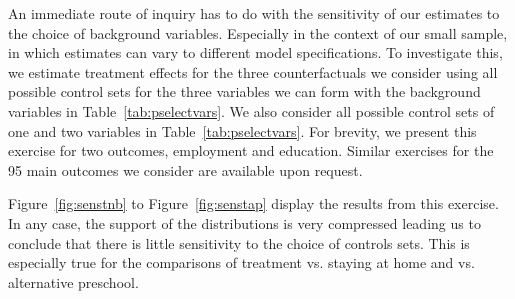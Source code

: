 \noindent An immediate route of inquiry has to do with the sensitivity of our estimates to the choice of background variables. Especially in the context of our small sample, in which estimates can vary to different model specifications. To investigate this, we estimate treatment effects for the three counterfactuals we consider using all possible control sets for the three variables we can form with the background variables in Table~\ref{tab:pselectvars}. We also consider all possible control sets of one and two variables in Table~\ref{tab:pselectvars}. For brevity, we present this exercise for two outcomes, employment and education. Similar exercises for the 95 main outcomes we consider are available upon request.

\noindent Figure~\ref{fig:senstnb} to Figure~\ref{fig:senstap} display the results from this exercise. In any case, the support of the distributions is very compressed leading us to conclude that there is little sensitivity to the choice of controls sets. This is especially true for the comparisons of treatment vs. staying at home and vs. alternative preschool.

